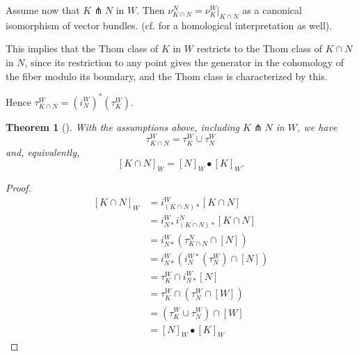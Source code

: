 \documentclass[reqno]{amsart}
\newtheorem{theorem}{Theorem}[section]
\theoremstyle{definition}
\theoremstyle{remark}
\begin{document}
      Assume now that
      $K \pitchfork N$  in $W$. Then
      $\nu_{K \cap N}^{N} = \nu_{K}^{W}|_{K \cap N}$ 
      as a canonical isomorphism of vector bundles.
      (cf. \cite[VIII, §11]{Dold} for a homological interpretation as well).

      This implies that the Thom class of $K$ in $W$ restricts
      to the Thom class of $K \cap N$ in $N$, since
      its restriction to any point gives the generator in the
      cohomology of the fiber modulo its boundary, and the
      Thom class is characterized by this.

      Hence $\tau_{K \cap N}^{W} = (i_N^{W})^{*} \left( \tau_K^{W} \right) $.




      \begin{theorem}[]
          With the assumptions above, including $K \pitchfork N$ in
          $W$, we have 
          \[
          \tau_{K \cap N}^{W} = \tau_K^{W} \cup \tau_N^{W}
          \] 
          and, equivalently, 
          \[
          \left[ K \cap N \right]_W = \left[ N \right]_W \bullet
          \left[ K \right]_W.
          \]
      \end{theorem}

      \begin{proof}
          \begin{align*}
              \left[ K \cap N \right]_W 
              &=  i_{(K \cap N)*}^{W}
              \left[ K \cap N \right] \\
              &= i_{N*}^{W} 
              i_{(K \cap N)*}^{N}
              \left[ K \cap N \right] \\
              &= i_{N*}^{W}
              \left( \tau_{K \cap N}^{N} \cap \left[ N \right]  \right) \\
              &=  i_{N*}^{W}
              \left( i_N^{W*}  (\tau_N^{W}) \cap
              \left[ N \right] \right) \\
              &= \tau_{K}^{W} \cap
              i_{N*}^{W} \left[ N \right] \\
              &= \tau_{K}^{W} \cap \left( \tau_N^{W} \cap
              \left[ W \right] \right) \\
              &= \left( \tau_K^{W} \cup 
              \tau_N^{W} \right) \cap \left[ W \right] \\
              &= \left[ N \right]_W \bullet \left[ K \right]_W
          \end{align*}
      \end{proof}
\end{document}
